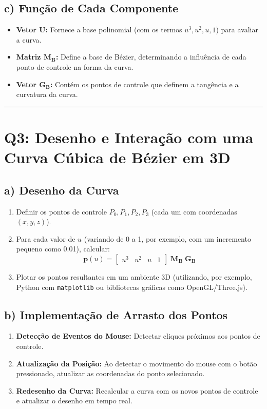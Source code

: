 \documentclass[a4paper,12pt]{article}
\begin{document}
\subsection*{c) Função de Cada Componente}
\begin{itemize}
    \item \textbf{Vetor \(\mathbf{U}\):} Fornece a base polinomial (com os termos \( u^3, u^2, u, 1 \)) para avaliar a curva.
    \item \textbf{Matriz \(\mathbf{M_B}\):} Define a base de Bézier, determinando a influência de cada ponto de controle na forma da curva.
    \item \textbf{Vetor \(\mathbf{G_B}\):} Contém os pontos de controle que definem a tangência e a curvatura da curva.
\end{itemize}

\hrule
\vspace{0.5cm}

\section*{Q3: Desenho e Interação com uma Curva Cúbica de Bézier em 3D}

\subsection*{a) Desenho da Curva}
\begin{enumerate}
    \item Definir os pontos de controle \( P_0, P_1, P_2, P_3 \) (cada um com coordenadas \((x,y,z)\)).
    \item Para cada valor de \( u \) (variando de 0 a 1, por exemplo, com um incremento pequeno como 0.01), calcular:
    \[
    \mathbf{p}(u) = \begin{bmatrix} u^3 & u^2 & u & 1 \end{bmatrix} \; \mathbf{M_B} \; \mathbf{G_B}
    \]
    \item Plotar os pontos resultantes em um ambiente 3D (utilizando, por exemplo, Python com \texttt{matplotlib} ou bibliotecas gráficas como OpenGL/Three.js).
\end{enumerate}

\subsection*{b) Implementação de Arrasto dos Pontos}
\begin{enumerate}
    \item \textbf{Detecção de Eventos do Mouse:} Detectar cliques próximos aos pontos de controle.
    \item \textbf{Atualização da Posição:} Ao detectar o movimento do mouse com o botão pressionado, atualizar as coordenadas do ponto selecionado.
    \item \textbf{Redesenho da Curva:} Recalcular a curva com os novos pontos de controle e atualizar o desenho em tempo real.
\end{enumerate}
\end{document}
